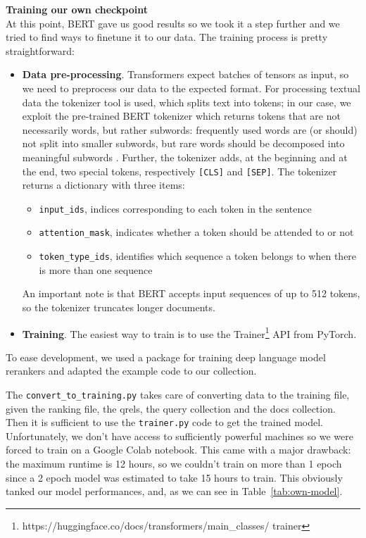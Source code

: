 \noindent \textbf{Training our own checkpoint}\\
At this point, BERT gave us good results so we took it a step further and we tried to find ways to finetune it to our data. The training process is pretty straightforward: 
\begin{itemize}
\item \textbf{Data pre-processing}. Transformers expect batches of tensors as input, so we need to preprocess our data to the expected format. For processing textual data the tokenizer tool is used, which splits text into tokens; in our case, we exploit the pre-trained BERT tokenizer which returns tokens that are not necessarily words, but rather subwords: frequently used words are (or should) not split into smaller subwords, but rare words should be decomposed into meaningful subwords \cite{HfTokenizer}. Further, the tokenizer adds, at the beginning and at the end, two special tokens, respectively \texttt{[CLS]} and \texttt{[SEP]}. The tokenizer returns a dictionary with three items: 
	\begin{itemize}
		\item \texttt{input\_ids}, indices corresponding to each token in the sentence
		\item \texttt{attention\_mask}, indicates whether a token should be attended to or not
		\item \texttt{token\_type\_ids}, identifies which sequence a token belongs to when there is more than one sequence
	\end{itemize}
An important note is that BERT accepts input sequences of up to 512 tokens, so the tokenizer truncates longer documents. 
\item \textbf{Training}. The easiest way to train is to use the Trainer\footnote{https://huggingface.co/docs/transformers/main\_classes/
trainer} API from PyTorch.
\end{itemize} 
To ease development, we used a package for training deep language model rerankers \cite{gao2021lce} and adapted the example code to our collection.

The \texttt{convert\_to\_training.py} takes care of converting data to the training file, given the ranking file, the qrels, the query collection and the docs collection. Then it is sufficient to use the \texttt{trainer.py} code to get the trained model. Unfortunately, we don't have access to sufficiently powerful machines so we were forced to train on a Google Colab notebook. This came with a major drawback: the maximum runtime is 12 hours, so we couldn't train on more than 1 epoch since a 2 epoch model was estimated to take 15 hours to train. This obviously tanked our model performances, and, as we can see in Table~\ref{tab:own-model}.

